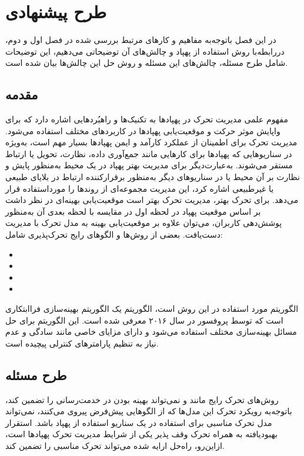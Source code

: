 \chapter{طرح پیشنهادی}\label{Chapter3}
در این فصل باتوجه‌به مفاهیم و کارهای مرتبط بررسی شده در فصل اول و دوم، دررابطه‌با روش استفاده از پهپاد و چالش‌های آن توضیحاتی می‌دهیم، این توضیحات شامل طرح مسئله، چالش‌های این مسئله و روش حل این چالش‌ها بیان شده است.
\section{مقدمه}
مفهوم علمی مدیریت تحرک در پهپادها به تکنیک‌ها و راهبُردهایی اشاره دارد که برای واپایش موثر حرکت و موقعیت‌یابی پهپادها در کاربردهای مختلف استفاده می‌شود. مدیریت تحرک برای اطمینان از عملکرد کارآمد و ایمن پهپادها بسیار مهم است، به‌ویژه در سناریوهایی که پهپادها برای کارهایی مانند جمع‌آوری داده، نظارت، تحویل یا ارتباط مستقر می‌شوند. به‌عبارت‌دیگر برای مدیریت بهتر پهپاد در یک محیط به‌منظور پایش و نظارت بر آن محیط یا در سناریوهای دیگر به‌منظور برقرارکننده ارتباط در بلایای طبیعی یا غیرطبیعی اشاره کرد، این مدیریت مجموعه‌ای از روندها را مورداستفاده قرار می‌دهد. برای تحرک بهتر، مدیریت تحرک بهتر است موقعیت‌یابی بهینه‌ای در نظر داشت بر اساس موقعیت پهپاد در لحظه اول در مقایسه با لحظه بعدی آن به‌منظور پوشش‌دهی کاربران، می‌توان علاوه بر موقعیت‌یابی بهینه به مدل تحرک با مدیریت دست‌یافت. بعضی از روش‌ها و الگوهای رایج تحرک‌پذیری شامل: 
\begin{itemize}
	\item {}
	\item {}
	\item {}
	\item {}
\end{itemize}
الگوریتم مورد استفاده در این روش  است، الگوریتم  یک الگوریتم بهینه‌سازی فراابتکاری است که توسط پروفسور  در سال ۲۰۱۶ معرفی شده است. این الگوریتم برای حل مسائل بهینه‌سازی مختلف استفاده می‌شود و دارای مزایای خاصی مانند سادگی و عدم نیاز به تنظیم پارامترهای کنترلی پیچیده است. 
\section{طرح مسئله}
روش‌های تحرک رایج مانند  و  نمی‌تواند بهینه بودن در خدمت‌رسانی را تضمین کند، باتوجه‌به رویکرد تحرک این مدل‌ها که از الگوهایی پیش‌فرض پیروی می‌کنند، نمی‌تواند مدل تحرک مناسبی برای استفاده در یک سناریو استفاده از پهپاد باشد. استقرار بهبودیافته به همراه تحرک وقف پذیر یکی از شرایط مدیریت تحرک پهپادها است، ازاین‌رو، راه‌حل ارایه شده می‌تواند تحرک مناسبی را تضمین کند.


